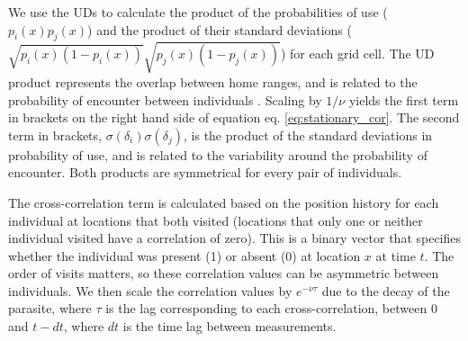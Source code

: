 \documentclass[letterpaper]{article}
\begin{document}
 

We use the UDs to calculate the product of the probabilities of use ($p_i(x)p_j(x)$) and the product of their standard deviations ($\sqrt{p_i(x)(1-p_i(x))}\sqrt{p_j(x)(1-p_j(x))}$) for each grid cell. 
The UD product represents the overlap between home ranges, and is related to the probability of encounter between individuals \citep{Noonan2021}. Scaling by $1/\nu$ yields the first term in brackets on the right hand side of equation eq. \ref{eq:stationary_cor}. %
The second term in brackets, $\sigma(\delta_i)\sigma(\delta_j)$, is the product of the standard deviations in probability of use, and is related to the variability around the probability of encounter. 
Both products are symmetrical for every pair of individuals. 

The cross-correlation term is calculated based on the position history for each individual at locations that both visited (locations that only one or neither individual visited have a correlation of zero). This is a binary vector that specifies whether the individual was present (1) or absent (0) at location $x$ at time $t$. 
The order of visits matters, so these correlation values can be asymmetric between individuals. 
We then scale the correlation values by $e^{-\nu\tau}$ due to the decay of the parasite, where $\tau$ is the lag corresponding to each cross-correlation, between 0 and $t-dt$, where $dt$ is the time lag between measurements. 
\end{document}
